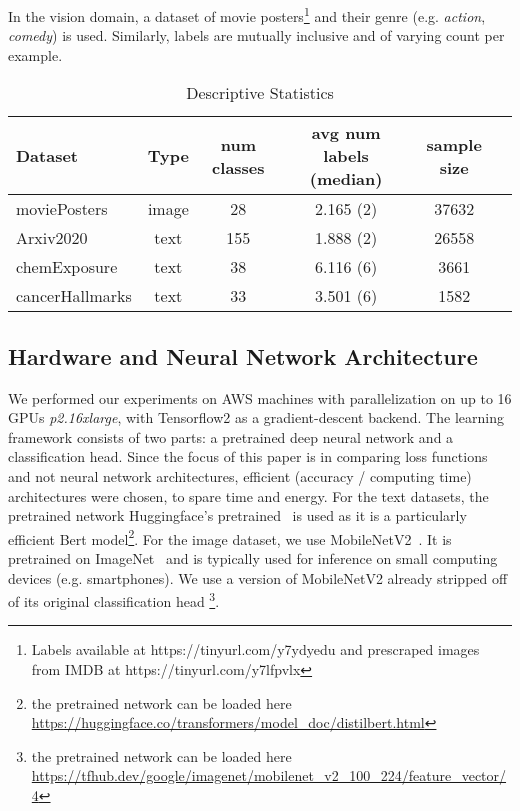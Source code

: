 In the vision domain, a dataset of movie posters\footnote{Labels available at https://tinyurl.com/y7ydyedu and prescraped images from IMDB at https://tinyurl.com/y7lfpvlx} and their genre (e.g. \emph{action}, \emph{comedy}) is used. Similarly, labels are mutually inclusive and of varying count per example. 

\begin{table}
\caption{Descriptive Statistics}
\label{tab:arxiv2020}
\centering
\begin{tabular}{l ccccc}
\toprule
Dataset & Type & num classes & avg num labels (median) & sample size\\
\midrule
moviePosters & image & 28 & 2.165 (2) & 37632\\
Arxiv2020 & text & 155 & 1.888 (2) & 26558\\ 
chemExposure & text & 38 & 6.116 (6) & 3661\\
cancerHallmarks & text & 33 & 3.501 (6) & 1582\\
\bottomrule
\end{tabular}
\end{table}

\subsection{Hardware and Neural Network Architecture}

We performed our experiments on AWS machines with parallelization on up to 16 GPUs \textit{p2.16xlarge}, with Tensorflow2 as a gradient-descent backend. The learning framework consists of two parts: a pretrained deep neural network and a classification head. Since the focus of this paper is in comparing loss functions and not neural network architectures, efficient  (accuracy / computing time) architectures were chosen, to spare time and energy.
For the text datasets, the pretrained network Huggingface's pretrained~\cite{distilBert} is used as it is a particularly efficient Bert model\footnote{the pretrained network can be loaded here \url{https://huggingface.co/transformers/model_doc/distilbert.html}}. For the image dataset, we use MobileNetV2~\cite{mobileNet}. It is pretrained on ImageNet~\cite{imagenet} and is typically used for inference on small computing devices (e.g. smartphones). We use a version of MobileNetV2 already stripped off of its original classification head  \footnote{the pretrained network can be loaded here \url{https://tfhub.dev/google/imagenet/mobilenet_v2_100_224/feature_vector/4}}.

